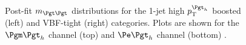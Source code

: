 \begin{figure}[tbh]

\caption[Post-fit $m_{\Pgt\Pgt}$ distributions for the 1-jet high
$\pt^{\Pgt_{h}}$ boosted and VBF-tight categories of the $\etau$ and $\mutau$
channels.]{Post-fit $m_{\Pgt\Pgt}$ distributions for the 1-jet high
$\pt^{\Pgt_{h}}$ boosted (left) and VBF-tight (right) categories. Plots are shown for
the $\mutau$ channel (top) and $\etau$ channel (bottom) \cite{HIG-13-004}.}
\label{fig:postfitmass}
\end{figure}


